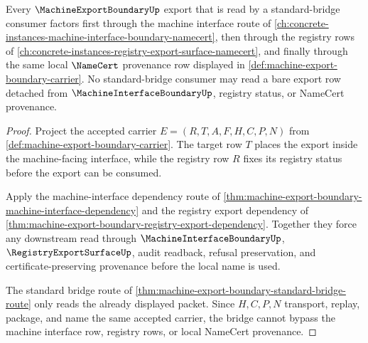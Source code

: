\begin{theorem}
\label{thm:machine-export-boundary-registry-forward-route}
Every $\MachineExportBoundaryUp$ export that is read by a standard-bridge consumer factors first through the machine interface route of \autoref{ch:concrete-instances-machine-interface-boundary-namecert}, then through the registry rows of \autoref{ch:concrete-instances-registry-export-surface-namecert}, and finally through the same local $\NameCert$ provenance row displayed in \autoref{def:machine-export-boundary-carrier}. No standard-bridge consumer may read a bare export row detached from $\MachineInterfaceBoundaryUp$, registry status, or NameCert provenance.
\end{theorem}
\begin{proof}
Project the accepted carrier $E=(R,T,A,F,H,C,P,N)$ from \autoref{def:machine-export-boundary-carrier}. The target row $T$ places the export inside the machine-facing interface, while the registry row $R$ fixes its registry status before the export can be consumed.

Apply the machine-interface dependency route of \autoref{thm:machine-export-boundary-machine-interface-dependency} and the registry export dependency of \autoref{thm:machine-export-boundary-registry-export-dependency}. Together they force any downstream read through $\MachineInterfaceBoundaryUp$, $\RegistryExportSurfaceUp$, audit readback, refusal preservation, and certificate-preserving provenance before the local name is used.

The standard bridge route of \autoref{thm:machine-export-boundary-standard-bridge-route} only reads the already displayed packet. Since $H,C,P,N$ transport, replay, package, and name the same accepted carrier, the bridge cannot bypass the machine interface row, registry rows, or local NameCert provenance.
\end{proof}
